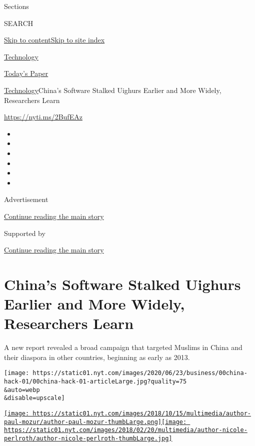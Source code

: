 Sections

SEARCH

\protect\hyperlink{site-content}{Skip to
content}\protect\hyperlink{site-index}{Skip to site index}

\href{https://www.nytimes.com/section/technology}{Technology}

\href{https://myaccount.nytimes.com/auth/login?response_type=cookie\&client_id=vi}{}

\href{https://www.nytimes.com/section/todayspaper}{Today's Paper}

\href{/section/technology}{Technology}\textbar{}China's Software Stalked
Uighurs Earlier and More Widely, Researchers Learn

\url{https://nyti.ms/2BufEAz}

\begin{itemize}
\item
\item
\item
\item
\item
\item
\end{itemize}

Advertisement

\protect\hyperlink{after-top}{Continue reading the main story}

Supported by

\protect\hyperlink{after-sponsor}{Continue reading the main story}

\hypertarget{chinas-software-stalked-uighurs-earlier-and-more-widely-researchers-learn}{%
\section{China's Software Stalked Uighurs Earlier and More Widely,
Researchers
Learn}\label{chinas-software-stalked-uighurs-earlier-and-more-widely-researchers-learn}}

A new report revealed a broad campaign that targeted Muslims in China
and their diaspora in other countries, beginning as early as 2013.

\texttt{[image: https://static01.nyt.com/images/2020/06/23/business/00china-hack-01/00china-hack-01-articleLarge.jpg?quality=75\\\&auto=webp\\\&disable=upscale]}

\href{https://www.nytimes.com/by/paul-mozur}{\texttt{[image: https://static01.nyt.com/images/2018/10/15/multimedia/author-paul-mozur/author-paul-mozur-thumbLarge.png]}}\href{https://www.nytimes.com/by/nicole-perlroth}{\texttt{[image: https://static01.nyt.com/images/2018/02/20/multimedia/author-nicole-perlroth/author-nicole-perlroth-thumbLarge.jpg]}}


